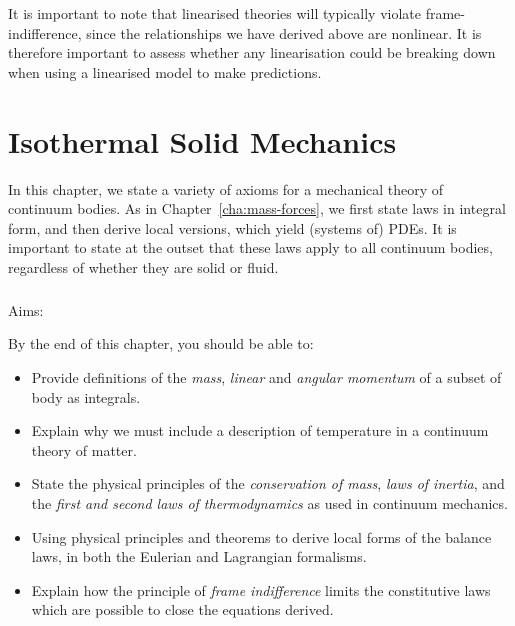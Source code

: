 \documentclass[
  letterpaper,
  DIV=11,
  numbers=noendperiod]{scrreprt}
\makeatletter
\let\oldparagraph\paragraph
\renewcommand{\paragraph}{
    \@ifstar
      \xxxParagraphStar
      \xxxParagraphNoStar
  }
\newcommand{\xxxParagraphStar}[1]{\oldparagraph*{#1}\mbox{}}
\newcommand{\xxxParagraphNoStar}[1]{\oldparagraph{#1}\mbox{}}
\theoremstyle{plain}
\theoremstyle{remark}
\makeatother
\begin{document}
It is important to note that linearised theories will typically violate
frame-indifference, since the relationships we have derived above are
nonlinear. It is therefore important to assess whether any linearisation
could be breaking down when using a linearised model to make
predictions.


\chapter{Isothermal Solid Mechanics}\label{cha:isoth-solid-mech}

In this chapter, we state a variety of axioms for a mechanical theory of
continuum bodies. As in
Chapter~\hyperref[cha:mass-forces]{{[}cha:mass-forces{]}}, we first
state laws in integral form, and then derive local versions, which yield
(systems of) PDEs. It is important to state at the outset that these
laws apply to all continuum bodies, regardless of whether they are solid
or fluid.

\paragraph{Aims:}\label{aims-1}

By the end of this chapter, you should be able to:

\begin{itemize}
\item
  Provide definitions of the \emph{mass}, \emph{linear} and
  \emph{angular momentum} of a subset of body as integrals.
\item
  Explain why we must include a description of temperature in a
  continuum theory of matter.
\item
  State the physical principles of the \emph{conservation of mass},
  \emph{laws of inertia}, and the \emph{first and second laws of
  thermodynamics} as used in continuum mechanics.
\item
  Using physical principles and theorems to derive local forms of the
  balance laws, in both the Eulerian and Lagrangian formalisms.
\item
  Explain how the principle of \emph{frame indifference} limits the
  constitutive laws which are possible to close the equations derived.
\end{itemize}
\end{document}
